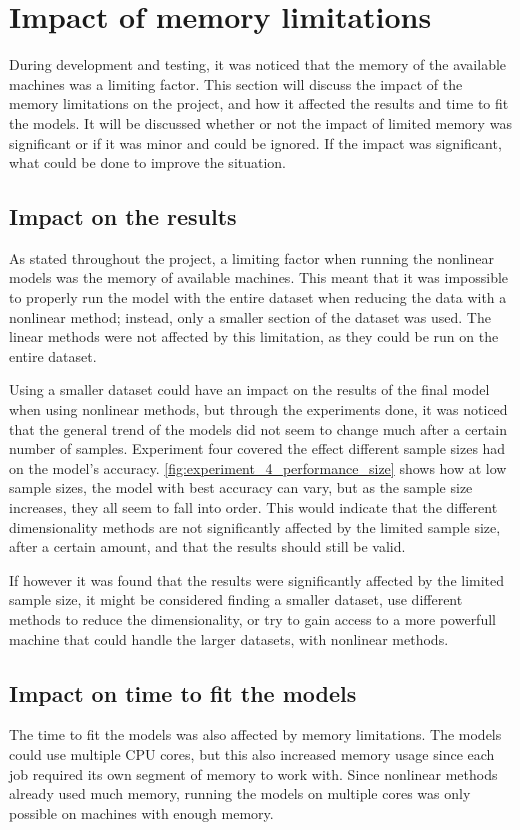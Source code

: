 \section{Impact of memory limitations}\label{sec:impact_of_memory_limitations}
During development and testing, it was noticed that the memory of the available machines was a limiting factor. This section will discuss the impact of the memory limitations on the project, and how it affected the results and time to fit the models. It will be discussed whether or not the impact of limited memory was significant or if it was minor and could be ignored. If the impact was significant, what could be done to improve the situation.


\subsection{Impact on the results}\label{subsec:impact_on_results}
As stated throughout the project, a limiting factor when running the nonlinear models was the memory of available machines. This meant that it was impossible to properly run the model with the entire dataset when reducing the data with a nonlinear method; instead, only a smaller section of the dataset was used. The linear methods were not affected by this limitation, as they could be run on the entire dataset.

Using a smaller dataset could have an impact on the results of the final model when using nonlinear methods, but through the experiments done, it was noticed that the general trend of the models did not seem to change much after a certain number of samples. Experiment four covered the effect different sample sizes had on the model's accuracy. \autoref{fig:experiment_4_performance_size} shows how at low sample sizes, the model with best accuracy can vary, but as the sample size increases, they all seem to fall into order. This would indicate that the different dimensionality methods are not significantly affected by the limited sample size, after a certain amount, and that the results should still be valid.

If however it was found that the results were significantly affected by the limited sample size, it might be considered finding a smaller dataset, use different methods to reduce the dimensionality, or try to gain access to a more powerfull machine that could handle the larger datasets, with nonlinear methods.


\subsection{Impact on time to fit the models}\label{subsec:impact_on_time_to_fit_the_models}
The time to fit the models was also affected by memory limitations. The models could use multiple CPU cores, but this also increased memory usage since each job required its own segment of memory to work with. Since nonlinear methods already used much memory, running the models on multiple cores was only possible on machines with enough memory.


